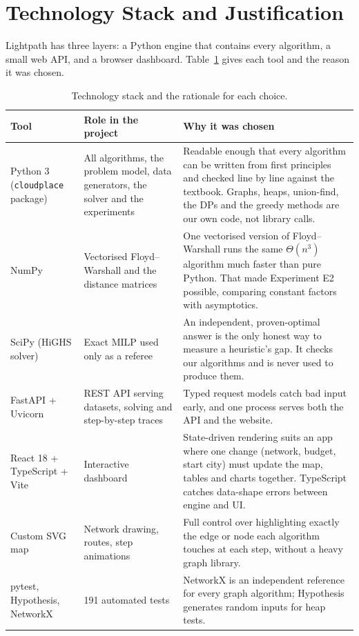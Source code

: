 \section{Technology Stack and Justification}\label{sec:tech}
Lightpath has three layers: a Python engine that contains every algorithm, a small web API, and a browser dashboard. Table~\ref{tab:tech} gives each tool and the reason it was chosen.

\begin{table}[!htbp]
\centering\small
\caption{Technology stack and the rationale for each choice.}\label{tab:tech}
\begin{tabularx}{\textwidth}{@{}p{2.9cm}p{4.2cm}X@{}}
\toprule
Tool & Role in the project & Why it was chosen\\
\midrule
Python 3 (\texttt{cloudplace} package) & All algorithms, the problem model, data generators, the solver and the experiments & Readable enough that every algorithm can be written from first principles and checked line by line against the textbook. Graphs, heaps, union-find, the DPs and the greedy methods are our own code, not library calls. \\
NumPy & Vectorised Floyd--Warshall and the distance matrices & One vectorised version of Floyd--Warshall runs the same $\Theta(n^3)$ algorithm much faster than pure Python. That made Experiment E2 possible, comparing constant factors with asymptotics. \\
SciPy (HiGHS solver) & Exact MILP used only as a referee & An independent, proven-optimal answer is the only honest way to measure a heuristic's gap. It checks our algorithms and is never used to produce them. \\
FastAPI + Uvicorn & REST API serving datasets, solving and step-by-step traces & Typed request models catch bad input early, and one process serves both the API and the website. \\
React 18 + TypeScript + Vite & Interactive dashboard & State-driven rendering suits an app where one change (network, budget, start city) must update the map, tables and charts together. TypeScript catches data-shape errors between engine and UI. \\
Custom SVG map & Network drawing, routes, step animations & Full control over highlighting exactly the edge or node each algorithm touches at each step, without a heavy graph library. \\
pytest, Hypothesis, NetworkX & 191 automated tests & NetworkX is an independent reference for every graph algorithm; Hypothesis generates random inputs for heap tests. \\
\bottomrule
\end{tabularx}
\end{table}

